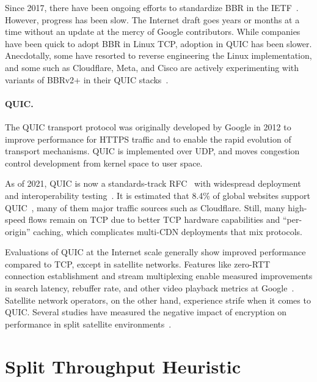 Since 2017, there have been ongoing efforts to standardize BBR in the IETF~\cite{cardwell2024bbr-ietf-draft}.
However, progress has been slow. The Internet draft goes years or months at a
time without an update at the mercy of Google contributors. While companies
have been quick to adopt BBR in Linux TCP, adoption in QUIC has been slower.
Anecdotally, some have resorted to reverse engineering the Linux
implementation, and some such as Cloudflare, Meta, and Cisco are actively
experimenting with variants of BBRv2+ in their QUIC stacks~\cite
{cardwell2024bbrv3-ietf119-qna}.

\paragraph{QUIC.}

The QUIC transport protocol was originally developed by Google in 2012 to
improve performance for HTTPS traffic and to enable the rapid
evolution of transport mechanisms. QUIC is implemented over UDP, and moves
congestion control development from kernel space to user space.

As of 2021, QUIC is now a standards-track RFC~\cite{rfc9000} with widespread
deployment and interoperability testing~\cite{quic-interop}. It is estimated
that 8.4\% of global websites support QUIC~\cite{w3techs}, many of them major
traffic sources such as Cloudflare.
Still, many high-speed flows remain on TCP due to better TCP hardware
capabilities and ``per-origin'' caching, which complicates multi-CDN
deployments that mix protocols.

Evaluations of QUIC at the Internet scale generally show improved performance
compared to TCP, except in satellite networks. Features like zero-RTT
connection establishment and stream multiplexing enable measured improvements
in search latency, rebuffer rate, and other video playback metrics at
Google~\cite{langley2017quic}. Satellite network operators, on the other hand,
experience strife when it comes to QUIC. Several studies have measured the
negative impact of encryption on performance in split satellite
environments~\cite
{kosek2022quicpep,martin2022suitability,kuhn2021quic-over-sat,border2020evaluating}.

\section{Split Throughput Heuristic}
\label{sec:splitting:heuristic}

